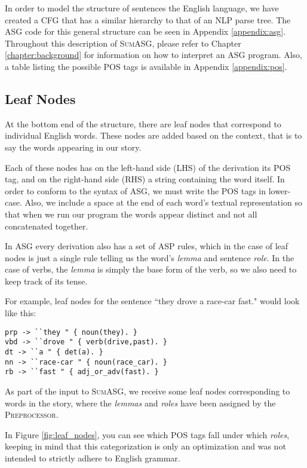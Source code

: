 In order to model the structure of sentences the English language, we have created a CFG that has a similar hierarchy to that of an NLP parse tree. The ASG code for this general structure can be seen in Appendix \ref{appendix:asg}. Throughout this description of \textsc{SumASG}, please refer to Chapter \ref{chapter:background} for information on how to interpret an ASG program. Also, a table listing the possible POS tags is available in Appendix \ref{appendix:pos}.

\subsection{Leaf Nodes}

At the bottom end of the structure, there are leaf nodes that correspond to individual English words. These nodes are added based on the context, that is to say the words appearing in our story.

Each of these nodes has on the left-hand side (LHS) of the derivation its POS tag, and on the right-hand side (RHS) a string containing the word itself. In order to conform to the syntax of ASG, we must write the POS tags in lower-case. Also, we include a space at the end of each word's textual representation so that when we run our program the words appear distinct and not all concatenated together.

In ASG every derivation also has a set of ASP rules, which in the case of leaf nodes is just a single rule telling us the word's \textit{lemma} and sentence \textit{role}. In the case of verbs, the \textit{lemma} is simply the base form of the verb, so we also need to keep track of its tense.

For example, leaf nodes for the sentence ``they drove a race-car fast." would look like this:

\begin{displayquote}
\begin{lstlisting}
prp -> ``they " { noun(they). }
vbd -> ``drove " { verb(drive,past). }
dt -> ``a " { det(a). }
nn -> ``race-car " { noun(race_car). }
rb -> ``fast " { adj_or_adv(fast). }
\end{lstlisting}
\end{displayquote}

As part of the input to \textsc{SumASG}, we receive some leaf nodes corresponding to words in the story, where the \textit{lemmas} and \textit{roles} have been assigned by the \textsc{Preprocessor}.

In Figure \ref{fig:leaf_nodes}, you can see which POS tags fall under which \textit{roles}, keeping in mind that this categorization is only an optimization and was not intended to strictly adhere to English grammar.

